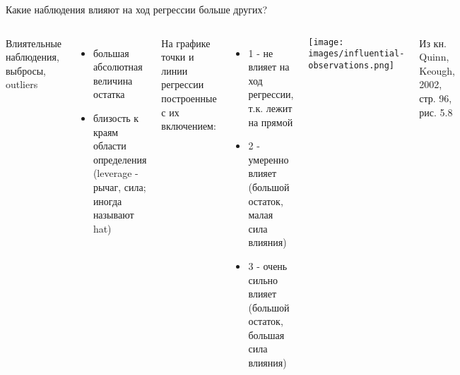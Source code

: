 \documentclass[
  ignorenonframetext,
  t,xcolor=table]{beamer}
\providecommand{\tightlist}{%
  \setlength{\itemsep}{0pt}\setlength{\parskip}{0pt}}
\newcommand{\columnsbegin}{\begin{columns}[T]}
\newcommand{\columnsend}{\end{columns}}
\begin{document}
\begin{frame}{Какие наблюдения влияют на ход регрессии больше других?}
\protect\hypertarget{ux43aux430ux43aux438ux435-ux43dux430ux431ux43bux44eux434ux435ux43dux438ux44f-ux432ux43bux438ux44fux44eux442-ux43dux430-ux445ux43eux434-ux440ux435ux433ux440ux435ux441ux441ux438ux438-ux431ux43eux43bux44cux448ux435-ux434ux440ux443ux433ux438ux445}{}
\columnsbegin
{}

Влиятельные наблюдения, выбросы, outliers

\begin{itemize}
\tightlist
\item
  большая абсолютная величина остатка
\item
  близость к краям области определения (leverage - рычаг, сила; иногда
  называют hat)
\end{itemize}

На графике точки и линии регрессии построенные с их включением:

\begin{itemize}
\tightlist
\item
  1 - не влияет на ход регрессии, т.к. лежит на прямой
\item
  2 - умеренно влияет (большой остаток, малая сила влияния)
\item
  3 - очень сильно влияет (большой остаток, большая сила влияния)
\end{itemize}


\centering

\texttt{[image: images/influential-observations.png]}

\raggedright

\tiny Из кн. Quinn, Keough, 2002, стр. 96, рис. 5.8

\columnsend
\end{frame}
\end{document}
